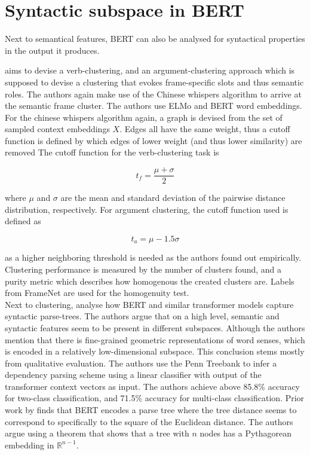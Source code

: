 \documentclass[a4paper,12pt,twoside,openright]{report}
\begin{document}


\section{Syntactic subspace in BERT}

Next to semantical features, BERT can also be analysed for syntactical properties in the output it produces.

\cite{ribeiro19} aims to devise a verb-clustering, and an argument-clustering approach which is supposed to devise a clustering that evokes frame-specific slots and thus semantic roles.
The authors again make use of the Chinese whispers algorithm
\cite{biemann06} to arrive at the semantic frame cluster.
The authors use ELMo and BERT word embeddings.
For the chinese whispers algorithm again, a graph is devised from the set of sampled context embeddings $X$.
Edges all have the same weight, thus a cutoff function is defined by  which edges of lower weight (and thus lower similarity) are removed
The cutoff function for the verb-clustering task is

\begin{equation}
t_f = \frac{\mu + \sigma}{2}
\end{equation}

where $\mu$ and $\sigma$ are the mean and standard deviation of the pairwise distance distribution, respectively. 
For argument clustering, the cutoff function used is defined as

\begin{equation}
t_a = \mu - 1.5 \sigma
\end{equation}

as a higher neighboring threshold is needed as the authors found out empirically.
Clustering performance is measured by the number of clusters found, and a purity metric which describes how homogenous the created clusters are. 
Labels from FrameNet \cite{baker98} are used for the homogenuity test. \\

Next to clustering, \cite{coenen19} analyse how BERT and similar transformer models capture syntactic parse-trees.
The authors argue that on a high level, semantic and syntactic features seem to be present in different subspaces.
Although the authors mention that there is fine-grained geometric representations of word senses, which is encoded in a relatively low-dimensional subspace.
This conclusion stems mostly from qualitative evaluation.
The authors use the Penn Treebank \cite{marcus93} to infer a dependency parsing scheme using a linear classifier with output of the transformer context vectors as input.
The authors achieve above 85.8\% accuracy for two-class classification, and 71.5\% accuracy for multi-class classification.
Prior work by \cite{hewitt19} finds that BERT encodes a parse tree where the tree distance seems to correspond to specifically to the square of the Euclidean distance.
The authors argue using a theorem that shows that a tree with $n$ nodes has a Pythagorean embedding in $\mathbb{R}^{n-1}$.
\end{document}
